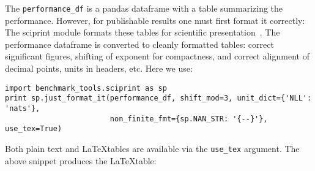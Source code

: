 \documentclass{article}
\newcommand{\code}{\texttt}
\begin{document}
The \code{performance\_df} is a pandas dataframe with a table summarizing the performance.
However, for publishable results one must first format it correctly:
The sciprint module formats these tables for scientific presentation~\citep{Cole2015}.
The performance dataframe is converted to cleanly formatted tables: correct significant figures, shifting of exponent for compactness, and correct alignment of decimal points, units in headers, etc.
Here we use:
\begin{verbatim}
import benchmark_tools.sciprint as sp
print sp.just_format_it(performance_df, shift_mod=3, unit_dict={'NLL': 'nats'},
                        non_finite_fmt={sp.NAN_STR: '{--}'}, use_tex=True)
\end{verbatim}
Both plain text and \LaTeX tables are available via the \code{use\_tex} argument.
The above snippet produces the \LaTeX table:\\
\end{document}
